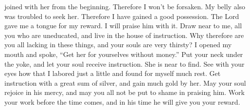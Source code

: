 joined with her from the beginning. Therefore I won't be forsaken.
 My belly also was troubled to seek her. Therefore I have
gained a good possession.  The Lord gave me a tongue for my
reward. I will praise him with it.  Draw near to me, all
you who are uneducated, and live in the house of instruction.
 Why therefore are you all lacking in these things, and
your souls are very thirsty?  I opened my mouth and spoke,
``Get her for yourselves without money.''  Put your neck
under the yoke, and let your soul receive instruction. She is near to
find.  See with your eyes how that I labored just a little
and found for myself much rest.  Get instruction with a
great sum of silver, and gain much gold by her.  May your
soul rejoice in his mercy, and may you all not be put to shame in
praising him.  Work your work before the time comes, and in
his time he will give you your reward.
